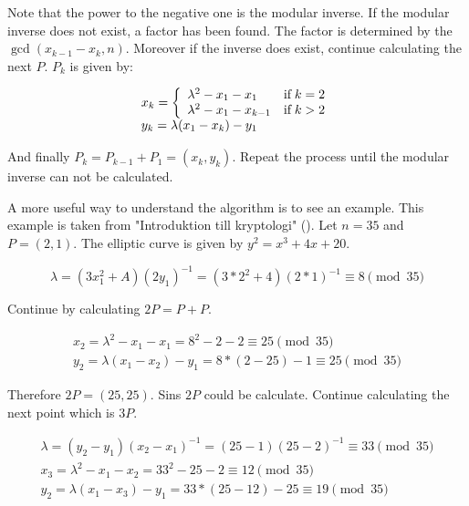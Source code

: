 Note that the power to the negative one is the modular inverse. If the modular inverse does not exist, a factor has been found. The factor is determined by the $\gcd(x_{k-1}-x_k, n)$. Moreover if the inverse does exist, continue calculating the next $P$. $P_k$ is given by:

\begin{equation*}
    \begin{array}{l}
        x_k =  \left\{\begin{array}{l l}
        \lambda^2 - x_1 - x_1 & \text{if}\; k = 2\\
        \lambda^2 - x_1 - x_{k-1} & \text{if}\; k > 2
        \end{array}\right.\\
        y_k = \lambda(x_1 - x_k) - y_1
    \end{array}
\end{equation*}

And finally $P_k = P_{k-1} + P_1 = (x_k,y_k)$. Repeat the process until the modular inverse can not be calculated.

A more useful way to understand the algorithm is to see an example. This example is taken from "Introduktion till kryptologi" (\cite{Cryptography101}).
Let $n = 35$ and $P = (2,1)$. The elliptic curve is given by $y^2 = x^3 + 4x + 20$.

\begin{equation*}
    \lambda = (3x_1^2 + A)(2y_1)^{-1} = (3*2^2+4)(2*1)^{-1} \equiv 8\pmod{35}
\end{equation*}

Continue by calculating $2P = P + P$.

\begin{equation*}
    \begin{array}{l}
        x_2 = \lambda^2 - x_1 - x_1 = 8^2 - 2 - 2 \equiv 25\pmod{35} \\
        y_2 = \lambda(x_1 - x_2) - y_1 = 8*(2-25) - 1 \equiv 25\pmod{35}
    \end{array}
\end{equation*}

Therefore $2P = (25, 25)$. Sins $2P$ could be calculate. Continue calculating the next point which is $3P$.

\begin{equation*}
    \begin{array}{l}
        \lambda = (y_2 - y_1)(x_2 - x_1)^{-1} = (25-1)(25-2)^{-1} \equiv 33\pmod{35} \\
        x_3 = \lambda^2 - x_1 - x_2 = 33^2 - 25 - 2 \equiv 12\pmod{35}\\
        y_2 = \lambda(x_1 - x_3) - y_1 = 33*(25-12)-25 \equiv 19\pmod{35}
    \end{array}
\end{equation*}

